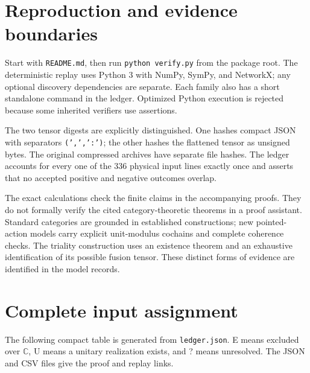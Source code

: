 \documentclass[11pt]{article}
\newcommand{\C}{\mathbb C}
\begin{document}







\section{Reproduction and evidence boundaries}
Start with \nolinkurl{README.md}, then run \nolinkurl{python verify.py} from the
package root. The deterministic replay uses Python 3 with NumPy, SymPy, and
NetworkX; any optional discovery dependencies are separate. Each family
also has a short standalone command in the ledger. Optimized Python
execution is rejected because some inherited verifiers use assertions.

The two tensor digests are explicitly distinguished. One hashes compact JSON
with separators \texttt{(',',':')}; the other hashes the flattened tensor as
unsigned bytes. The original compressed archives have separate file hashes.
The ledger accounts for every one of the 336 physical input lines exactly once
and asserts that no accepted positive and negative outcomes overlap.

The exact calculations check the finite claims in the accompanying proofs.
They do not formally verify the cited category-theoretic theorems in a proof
assistant. Standard categories are grounded in established constructions;
new pointed-action models carry explicit unit-modulus cochains and complete
coherence checks. The triality construction uses an existence theorem and
an exhaustive identification of its possible fusion tensor. These distinct
forms of evidence are identified in the model records.

\appendix
\section{Complete input assignment}
The following compact table is generated from \nolinkurl{ledger.json}.
E means excluded over $\C$, U means a unitary realization exists, and
? means unresolved. The JSON and CSV files give the proof and replay links.

\end{document}
